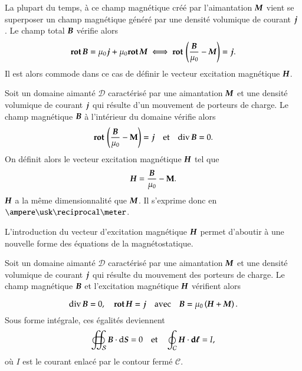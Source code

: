 La plupart du temps, à ce champ magnétique créé par l'aimantation $\vecM$ 
vient se superposer
un champ magnétique généré par une densité volumique de courant $\vecj$ . Le champ total
$\vecb$ vérifie alors
\begin{equation}
	\rot \vecb = \mu_0 \vecj + \mu_0 \rot \vecM \iff \rot\left(\dfrac{\vecb}{\mu_0} 
	- \vecM\right) = \vecj.
\end{equation}
Il est alors commode dans ce cas de définir le vecteur excitation magnétique 
$\vecH$.

\begin{defn}
	Soit un domaine aimanté $\mathcal{D}$ caractérisé par une aimantation 
	$\vecM$ et
	une densité volumique de courant $\vecj$ qui résulte d'un mouvement 
	de porteurs de charge. Le champ magnétique $\vecb$ 
	à l'intérieur du domaine vérifie alors
	\begin{equation*}
		\rot\left(\dfrac{\vecb}{\mu_0} - \vec{M}\right) = \vecj
		\quad \mathrm{et} \quad \div \vecb = 0.
	\end{equation*}
	On définit alors le vecteur excitation magnétique $\vecH$ tel que
	\begin{equation}
		\vecH = \dfrac{\vecb}{\mu_0} - \vec{M}.
	\end{equation}
	$\vecH$ a la même dimensionnalité que $\vecM$. Il s'exprime donc en 
	$\ampere \usk \reciprocal \meter$. 
\end{defn}	

L'introduction du vecteur d'excitation magnétique $\vecH$ permet d'aboutir
à une nouvelle forme des équations de la magnétostatique.

\begin{defn}
	Soit un domaine aimanté $\mathcal{D}$ caractérisé par une aimantation $\vecM$ et
	une densité volumique de courant $\vecj$ qui résulte du mouvement 
	des porteurs de charge. Le champ magnétique $\vecb$ et 
	l'excitation magnétique $\vecH$ vérifient alors

\begin{equation}
		\div \vecb = 0, \quad \rot \vecH = \vecj \quad \mathrm{avec}
		\quad \vecb = \mu_0 \left(\vecH + \vecM\right).
\end{equation}
Sous forme intégrale, ces égalités deviennent
\begin{equation}
	\oiint_\mathcal{S} \vecb \cdot \ds = 0 \quad \mathrm{et} 
	\quad \oint_\mathcal{C} \vecH \cdot
	\dl = I,
\end{equation}
où $I$ est le courant enlacé par le contour fermé $\mathcal{C}$.
\end{defn}

